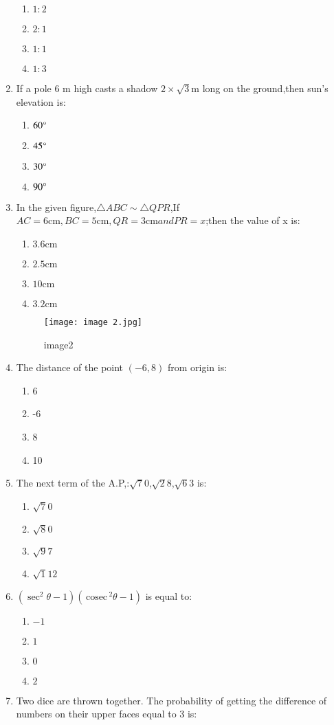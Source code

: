 \documentclass[12pt,-letter paper]{article}
\providecommand{\brak}[1]{\ensuremath{\left(#1\right)}}
\newcommand{\cosec}{\,\text{cosec}\,}
\begin{document}
\begin{enumerate}
	\begin{enumerate}
	\item $1:2$
	\item $2:1$
	\item $1:1$
	\item $1:3$
\end{enumerate}
\item If a pole 6 m high casts a shadow $2 \times \sqrt{3}$m long on the ground,then sun's elevation is:
	\begin{enumerate}
	\item $60\degree$
	\item $45\degree$
	\item $30\degree$
	\item $90\degree$
	\end{enumerate}
\item In the given figure,$\triangle ABC \sim \triangle QPR$,If $AC = 6\mathrm{cm},BC = 5 \mathrm{cm},QR = 3\mathrm{cm}  and PR = x$;then the value of  x is:
	\begin{enumerate}
	\item $3.6 \mathrm{cm}$
	\item $2.5\mathrm{cm}$
	\item $10 \mathrm{cm}$
	\item $3.2 \mathrm{cm}$
	\end{enumerate}
	\begin{figure}[!ht]
\centering
\texttt{[image: image 2.jpg]}
\label{fig:image1}
	\caption{image2}
\end{figure}
\item The distance of the point $\brak{-6,8}$ from origin is:
	\begin{enumerate}
	\item 6
	\item -6
	\item 8
	\item 10
\end{enumerate}
\item The next term of the A.P,:$\sqrt 70$,$\sqrt 28$,$\sqrt 63$ is:
	\begin{enumerate}
        \item $\sqrt 70$
	\item $\sqrt 80$
	\item $\sqrt 97$
	\item $\sqrt 112$
\end{enumerate}
\item $ (\sec^2 \theta - 1)(\cosec^2 \theta - 1)$
is equal to:
\begin{enumerate}
	\item $-1$
	\item $1$
	\item $0$
	\item $2$
\end{enumerate}
\item  Two dice are thrown together. The probability of getting the difference of numbers on their upper faces equal to 3 is:


\end{enumerate}
\end{document}
